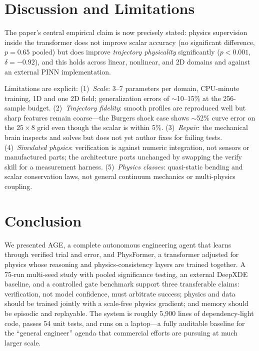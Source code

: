 \documentclass[conference,10pt]{IEEEtran}
\begin{document}
\section{Discussion and Limitations}
The paper's central empirical claim is now precisely stated: physics
supervision inside the transformer does not improve scalar accuracy
(no significant difference, $p=0.65$ pooled) but does improve
\emph{trajectory physicality} significantly ($p<0.001$, $\delta=-0.92$),
and this holds across linear, nonlinear, and 2D domains and against an
external PINN implementation.

Limitations are explicit: (1)~\emph{Scale}: 3--7 parameters per domain,
CPU-minute training, 1D and one 2D field; generalization errors of
$\sim$10--15\% at the 256-sample budget. (2)~\emph{Trajectory fidelity}:
smooth profiles are reproduced well but sharp features remain coarse---the
Burgers shock case shows $\sim$52\% curve error on the $25\times8$ grid
even though the scalar is within 5\%. (3)~\emph{Repair}: the mechanical
brain inspects and solves but does not yet author fixes for failing tests.
(4)~\emph{Simulated physics}: verification is against numeric integration,
not sensors or manufactured parts; the architecture ports unchanged by
swapping the verify skill for a measurement harness. (5)~\emph{Physics
classes}: quasi-static bending and scalar conservation laws, not general
continuum mechanics or multi-physics coupling.

\section{Conclusion}
We presented AGE, a complete autonomous engineering agent that learns
through verified trial and error, and PhysFormer, a transformer adjusted
for physics whose reasoning and physics-consistency layers are trained
together. A 75-run multi-seed study with pooled significance testing, an
external DeepXDE baseline, and a controlled gate benchmark support three
transferable claims: verification, not model confidence, must arbitrate
success; physics and data should be trained jointly with a scale-free
physics gradient; and memory should be episodic and replayable. The system
is roughly 5,900 lines of dependency-light code, passes 54 unit tests, and
runs on a laptop---a fully auditable baseline for the ``general engineer''
agenda that commercial efforts are pursuing at much larger scale.
\end{document}

